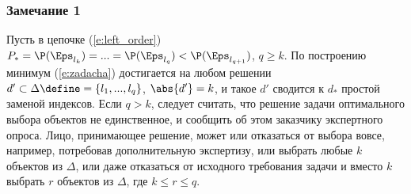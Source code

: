 \subsubsection*{Замечание 1}
\begin{notice}
Пусть в цепочке (\ref{e:left_order}) $P_* = \P(\Eps_{l_k}) = ... = \P(\Eps_{l_q}) < \P(\Eps_{l_{q+1}})$, $q \geq k$. По построению минимум (\ref{e:zadacha}) достигается на любом решении $d' \subset \Delta \define= \{l_1, ..., l_q\}$, $\abs{d'} = k$, и такое $d'$ сводится к $d_*$ простой заменой индексов. Если $q > k$, следует считать, что решение задачи оптимального выбора объектов не единственное, и сообщить об этом заказчику экспертного опроса. Лицо, принимающее решение, может или отказаться от выбора вовсе, например, потребовав дополнительную экспертизу, или выбрать любые $k$ объектов из $\Delta$, или даже отказаться от исходного требования задачи и вместо $k$ выбрать $r$ объектов из $\Delta$, где $k \leq r \leq q$.
\end{notice}

